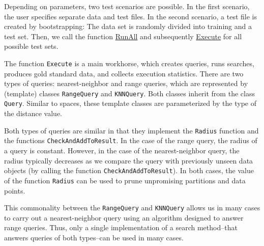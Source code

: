 \documentclass[runningheads,a4paper]{llncs}
\newcommand{\replocfile}{https://github.com/searchivarius/NonMetricSpaceLib/blob/pserv/}
\newcommand{\ttt}[1]{\texttt{#1}}
\begin{document}

Depending on parameters, two test scenarios are possible.
In the first scenario, the user specifies separate data and test files.
In the second scenario, a test file is created by bootstrapping:
The data set is randomly divided into training and a test set.
Then,
we call the function \href{\replocfile similarity_search/include/experiments.h#L70}{RunAll} 
and subsequently \href{\replocfile similarity_search/include/experiments.h#L213}{Execute} for all possible test sets.

The function \ttt{Execute} is a main workhorse, which creates queries, runs searches,
produces gold standard data, and collects execution statistics.
There are two types of queries: nearest-neighbor and range queries,
which are represented by (template) classes \ttt{RangeQuery} and \ttt{KNNQuery}.
Both classes inherit from the class \ttt{Query}.
Similar to spaces, these template classes are parameterized by the type of the distance value.

Both types of queries are similar in that they implement the \ttt{Radius} function
and the functions \ttt{CheckAndAddToResult}. 
In the case of the range query, the radius of a query is constant.
However, in the case of the nearest-neighbor query,
the radius typically decreases as we compare the query
with previously unseen data objects (by calling the function \ttt{CheckAndAddToResult}).
In both cases, the value of the function \ttt{Radius} can be used to prune unpromising
partitions and data points.

This commonality between the \ttt{RangeQuery} and \ttt{KNNQuery}
allows us in many cases to carry out a nearest-neighbor query 
using an algorithm designed to answer range queries.
Thus, only a single implementation of a search method--that answers queries of both types--can be used in many cases.
\end{document}
